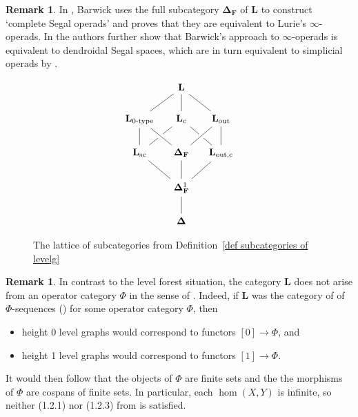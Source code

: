 \documentclass{amsart}
\numberwithin{theorem}{subsection}
\theoremstyle{definition}
\newtheorem{remark}[theorem]{Remark}
\newcommand{\finsetskel}{\mathbf{F}}
\newcommand{\name}[1]{\ensuremath{\text{\textup{#1}}}}
\newcommand{\simp}{\mathbf{\Delta}}
\newcommand{\levelg}{\mathbf{L}}
\newcommand{\levelgconn}{\levelg_{\name{c}}}
\begin{document}
\begin{remark}
In \cite{bar}, Barwick uses the full subcategory $\simp_{\finsetskel}$ of $\levelg$ to construct `complete Segal operads' and proves that they are equivalent to Lurie's $\infty$-operads. 
In \cite{ChuHaugsengHeuts} the authors further show that Barwick's approach to $\infty$-operads is equivalent to dendroidal Segal spaces, which are in turn equivalent to simplicial operads by \cite{CisinkiMoerdijk2}.
\end{remark}

\begin{figure}
\[ \begin{tikzcd}[column sep=small]
& \levelg \arrow[d, no head] \arrow[dr, no head] \arrow[dl, no head] \\
\levelg_{\name{0-type}} \arrow[d, no head] & \levelgconn \arrow[dl, no head] \arrow[dr, no head] & \levelg_{\name{out}} \arrow[d, no head] \arrow[dl, no head, crossing over] \\
\levelg_{\name{sc}} \arrow[dr, no head] & \simp_{\finsetskel} \arrow[d, no head] \arrow[ul, no head, crossing over] & \levelg_{\name{out,c}} \arrow[dl, no head] \\
& \simp_{\finsetskel}^1 \arrow[d, no head] \\
& \simp
\end{tikzcd} \]
\caption{The lattice of subcategories from Definition~\ref{def subcategories of levelg}} \label{figure lattice of subcategories}
\end{figure}

\begin{remark}\label{remark level not phi seq}
In contrast to the level forest situation, the category $\levelg$ does not arise from an operator category $\Phi$ in the sense of \cite[Definition 1.2]{bar}. 
Indeed, if $\levelg$ was the category of of $\Phi$-sequences (\cite[Definition 2.4]{bar}) for some operator category $\Phi$, then
\begin{itemize}
\item height 0 level graphs would correspond to functors $[0] \to \Phi$, and
\item height 1 level graphs would correspond to functors $[1] \to \Phi$.
\end{itemize}
It would then follow that the objects of $\Phi$ are finite sets and the the morphisms of $\Phi$ are cospans of finite sets.
In particular, each $\hom(X,Y)$ is infinite, so neither (1.2.1) nor (1.2.3) from \cite{bar} is satisfied.
\end{remark}
\end{document}
